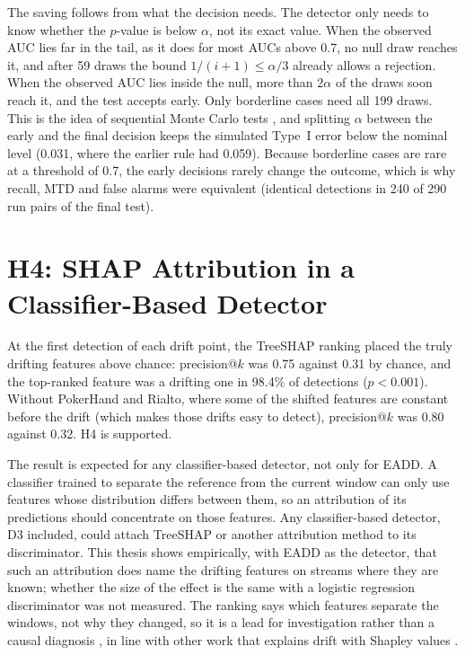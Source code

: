 The saving follows from what the decision needs. The detector only needs to know whether the $p$-value is below $\alpha$, not its exact value. When the observed AUC lies far in the tail, as it does for most AUCs above 0.7, no null draw reaches it, and after 59 draws the bound $1/(i+1) \le \alpha/3$ already allows a rejection. When the observed AUC lies inside the null, more than $2\alpha$ of the draws soon reach it, and the test accepts early. Only borderline cases need all 199 draws. This is the idea of sequential Monte Carlo tests \citep{BesagClifford1991, Gandy2009}, and splitting $\alpha$ between the early and the final decision keeps the simulated Type~I error below the nominal level (0.031, where the earlier rule had 0.059). Because borderline cases are rare at a threshold of 0.7, the early decisions rarely change the outcome, which is why recall, MTD and false alarms were equivalent (identical detections in 240 of 290 run pairs of the final test).

\section{H4: SHAP Attribution in a Classifier-Based Detector}
\label{sec:disc-h4}

At the first detection of each drift point, the TreeSHAP ranking \citep{Lundberg2017, LundbergInteraction2020} placed the truly drifting features above chance: precision@$k$ was 0.75 against 0.31 by chance, and the top-ranked feature was a drifting one in 98.4\% of detections ($p < 0.001$). Without PokerHand and Rialto, where some of the shifted features are constant before the drift (which makes those drifts easy to detect), precision@$k$ was 0.80 against 0.32. H4 is supported.

The result is expected for any classifier-based detector, not only for EADD. A classifier trained to separate the reference from the current window can only use features whose distribution differs between them, so an attribution of its predictions should concentrate on those features. Any classifier-based detector, D3 included, could attach TreeSHAP or another attribution method to its discriminator. This thesis shows empirically, with EADD as the detector, that such an attribution does name the drifting features on streams where they are known; whether the size of the effect is the same with a logistic regression discriminator was not measured. The ranking says which features separate the windows, not why they changed, so it is a lead for investigation rather than a causal diagnosis \citep{CausalDrift2025}, in line with other work that explains drift with Shapley values \citep{DBShap2024, HinderFeature2024}.

